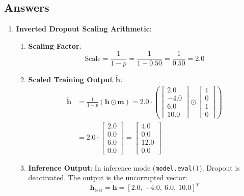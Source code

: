 \subsection*{Answers}\label{subsec:training_answers}

\begin{enumerate}
    \item \textbf{Inverted Dropout Scaling Arithmetic}:
    \begin{enumerate}[label=(\alph*)]
        \item \textbf{Scaling Factor}:
        \begin{equation*}
        \text{Scale} = \frac{1}{1 - p} = \frac{1}{1 - 0.50} = \frac{1}{0.50} = \mathbf{2.0}
        \end{equation*}

        \item \textbf{Scaled Training Output $\tilde{\mathbf{h}}$}:
        \begin{align*}
        \tilde{\mathbf{h}} &= \frac{1}{1 - p} (\mathbf{h} \odot \mathbf{m}) = 2.0 \cdot \left( \begin{bmatrix} 2.0 \\ -4.0 \\ 6.0 \\ 10.0 \end{bmatrix} \odot \begin{bmatrix} 1 \\ 0 \\ 1 \\ 0 \end{bmatrix} \right) \\
        &= 2.0 \cdot \begin{bmatrix} 2.0 \\ 0.0 \\ 6.0 \\ 0.0 \end{bmatrix} = \begin{bmatrix} \mathbf{4.0} \\ \mathbf{0.0} \\ \mathbf{12.0} \\ \mathbf{0.0} \end{bmatrix}
        \end{align*}

        \item \textbf{Inference Output}:
        In inference mode (\texttt{model.eval()}), Dropout is deactivated. The output is the uncorrupted vector:
        \begin{equation*}
        \mathbf{h}_{\text{test}} = \mathbf{h} = [\mathbf{2.0}, \ \mathbf{-4.0}, \ \mathbf{6.0}, \ \mathbf{10.0}]^T
        \end{equation*}


\end{enumerate}
\end{enumerate}
